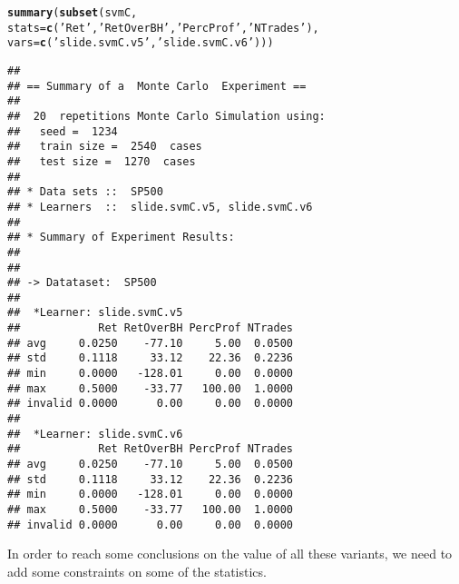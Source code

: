 \documentclass{article}\usepackage[]{graphicx}\usepackage[]{color}
\makeatletter
\newcommand{\hlstr}[1]{\textcolor[rgb]{0.192,0.494,0.8}{#1}}%
\newcommand{\hlstd}[1]{\textcolor[rgb]{0.345,0.345,0.345}{#1}}%
\newcommand{\hlkwc}[1]{\textcolor[rgb]{0.333,0.667,0.333}{#1}}%
\newcommand{\hlkwd}[1]{\textcolor[rgb]{0.737,0.353,0.396}{\textbf{#1}}}%
\newenvironment{kframe}{%
 \def\at@end@of@kframe{}%
 \ifinner\ifhmode%
  \def\at@end@of@kframe{\end{minipage}}%
  \begin{minipage}{\columnwidth}%
 \fi\fi%
 \def\FrameCommand##1{\hskip\@totalleftmargin \hskip-\fboxsep
 \colorbox{shadecolor}{##1}\hskip-\fboxsep
     \hskip-\linewidth \hskip-\@totalleftmargin \hskip\columnwidth}%
 \MakeFramed {\advance\hsize-\width
   \@totalleftmargin\z@ \linewidth\hsize
   \@setminipage}}%
 {\par\unskip\endMakeFramed%
 \at@end@of@kframe}
\newenvironment{knitrout}{}{} %
\makeatother
\begin{document}
\begin{knitrout}
\color{fgcolor}\begin{kframe}
\begin{alltt}
\hlkwd{summary}\hlstd{(}\hlkwd{subset}\hlstd{(svmC,}
               \hlkwc{stats} \hlstd{=} \hlkwd{c}\hlstd{(}\hlstr{'Ret'}\hlstd{,} \hlstr{'RetOverBH'}\hlstd{,} \hlstr{'PercProf'}\hlstd{,} \hlstr{'NTrades'}\hlstd{),}
               \hlkwc{vars} \hlstd{=} \hlkwd{c}\hlstd{(}\hlstr{'slide.svmC.v5'}\hlstd{,} \hlstr{'slide.svmC.v6'}\hlstd{)))}
\end{alltt}
\begin{verbatim}
## 
## == Summary of a  Monte Carlo  Experiment ==
## 
##  20  repetitions Monte Carlo Simulation using: 
## 	 seed =  1234 
## 	 train size =  2540  cases 
## 	 test size =  1270  cases 
## 
## * Data sets ::  SP500
## * Learners  ::  slide.svmC.v5, slide.svmC.v6
## 
## * Summary of Experiment Results:
## 
## 
## -> Datataset:  SP500 
## 
## 	*Learner: slide.svmC.v5 
##            Ret RetOverBH PercProf NTrades
## avg     0.0250    -77.10     5.00  0.0500
## std     0.1118     33.12    22.36  0.2236
## min     0.0000   -128.01     0.00  0.0000
## max     0.5000    -33.77   100.00  1.0000
## invalid 0.0000      0.00     0.00  0.0000
## 
## 	*Learner: slide.svmC.v6 
##            Ret RetOverBH PercProf NTrades
## avg     0.0250    -77.10     5.00  0.0500
## std     0.1118     33.12    22.36  0.2236
## min     0.0000   -128.01     0.00  0.0000
## max     0.5000    -33.77   100.00  1.0000
## invalid 0.0000      0.00     0.00  0.0000
\end{verbatim}
\end{kframe}
\end{knitrout}
In order to reach some conclusions on the value of all these variants, we need to add some constraints on some of the statistics.
\end{document}
